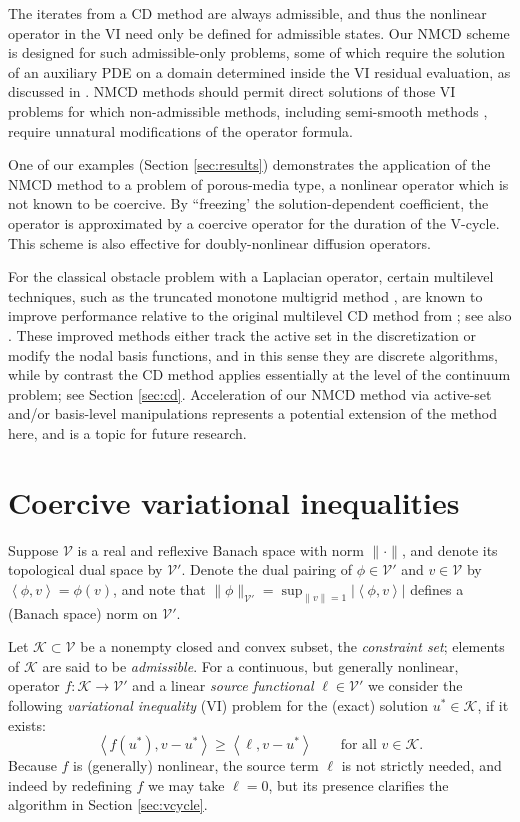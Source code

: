 \documentclass[letterpaper,final,12pt,reqno]{amsart}
\theoremstyle{cstyle}
\theoremstyle{cstyle*}
\theoremstyle{dstyle}
\numberwithin{equation}{section}
\numberwithin{figure}{section}
\numberwithin{table}{section}
\numberwithin{theorem}{section}
\newcommand{\cK}{\mathcal{K}}
\newcommand{\cV}{\mathcal{V}}
\newcommand{\ip}[2]{\left<#1,#2\right>}
\begin{document}
The iterates from a CD method are always admissible, and thus the nonlinear operator in the VI need only be defined for admissible states.  Our NMCD scheme is designed for such admissible-only problems, some of which require the solution of an auxiliary PDE on a domain determined inside the VI residual evaluation, as discussed in \cite{Bueler2021conservation}.  NMCD methods should permit direct solutions of those VI problems for which non-admissible methods, including semi-smooth methods \cite{BensonMunson2006}, require unnatural modifications of the operator formula.

One of our examples (Section \ref{sec:results}) demonstrates the application of the NMCD method to a problem of porous-media type, a nonlinear operator which is not known to be coercive.  By ``freezing' the solution-dependent coefficient, the operator is approximated by a coercive operator for the duration of the V-cycle.  This scheme is also effective for doubly-nonlinear diffusion operators.

For the classical obstacle problem with a Laplacian operator, certain multilevel techniques, such as the truncated monotone multigrid method \cite{Kornhuber1994}, are known to improve performance relative to the original multilevel CD method from \cite{Tai2003}; see also \cite{GraeserKornhuber2009}.  These improved methods either track the active set in the discretization or modify the nodal basis functions, and in this sense they are discrete algorithms, while by contrast the CD method applies essentially at the level of the continuum problem; see Section \ref{sec:cd}.  Acceleration of our NMCD method via active-set and/or basis-level manipulations represents a potential extension of the method here, and is a topic for future research.


\section{Coercive variational inequalities} \label{sec:vi}

Suppose $\cV$ is a real and reflexive Banach space with norm $\|\cdot\|$, and denote its topological dual space by $\cV'$.  Denote the dual pairing of $\phi \in \cV'$ and $v\in\cV$ by $\ip{\phi}{v} = \phi(v)$, and note that $\|\phi\|_{\cV'} = \sup_{\|v\|=1} |\ip{\phi}{v}|$ defines a (Banach space) norm on $\cV'$.

Let $\cK \subset \cV$ be a nonempty closed and convex subset, the \emph{constraint set}; elements of $\cK$ are said to be \emph{admissible}.  For a continuous, but generally nonlinear, operator $f:\cK \to \cV'$ and a linear \emph{source functional} $\ell\in \cV'$ we consider the following \emph{variational inequality} (VI) problem for the (exact) solution $u^*\in \cK$, if it exists:
\begin{equation}
\ip{f(u^*)}{v-u^*} \ge \ip{\ell}{v-u^*} \qquad \text{for all } v\in \cK. \label{eq:vi}
\end{equation}
Because $f$ is (generally) nonlinear, the source term $\ell$ is not strictly needed, and indeed by redefining $f$ we may take $\ell=0$, but its presence clarifies the algorithm in Section \ref{sec:vcycle}.
\end{document}
